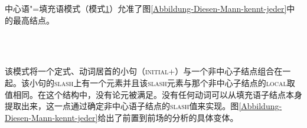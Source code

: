 \noindent
中心语"=填充语模式（模式\ref{hf-schemaa}）允准了图\vref{Abbildung-Diesen-Mann-kennt-jeder}中的最高结点。
%
\begin{figure}
\begin{schema}[中心语"=填充语模式]
\label{hf-schemaa}
~\\\samepage
{} \impl\\
\end{schema}
\vspace{-\baselineskip}
\end{figure}%
该模式将一个定式、动词居首的小句（\textsc{initial}+）与一个非中心子结点组合在一起。该小句的\textsc{slash}上有一个元素并且该\textsc{slash}元素与那个非中心子结点的\textsc{local}取值相同。在这个结构中，没有论元被满足。没有任何动词可以从填充语子结点本身提取出来，这一点通过确定非中心语子结点的\textsc{slash}值来实现。图\ref{Abbildung-Diesen-Mann-kennt-jeder}给出了前置到前场的分析的具体变体。
